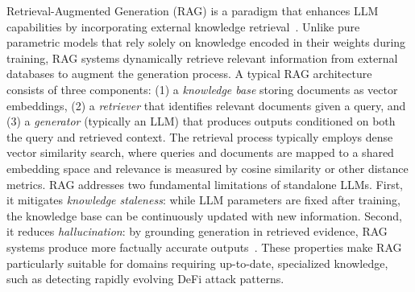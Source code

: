 Retrieval-Augmented Generation (RAG) is a paradigm that enhances LLM capabilities by incorporating external knowledge retrieval~\cite{lewis2021retrievalaugmentedgenerationknowledgeintensivenlp}. Unlike pure parametric models that rely solely on knowledge encoded in their weights during training, RAG systems dynamically retrieve relevant information from external databases to augment the generation process.
A typical RAG architecture consists of three components: (1) a \textit{knowledge base} storing documents as vector embeddings, (2) a \textit{retriever} that identifies relevant documents given a query, and (3) a \textit{generator} (typically an LLM) that produces outputs conditioned on both the query and retrieved context. The retrieval process typically employs dense vector similarity search, where queries and documents are mapped to a shared embedding space and relevance is measured by cosine similarity or other distance metrics.
RAG addresses two fundamental limitations of standalone LLMs. First, it mitigates \textit{knowledge staleness}: while LLM parameters are fixed after training, the knowledge base can be continuously updated with new information. Second, it reduces \textit{hallucination}: by grounding generation in retrieved evidence, RAG systems produce more factually accurate outputs~\cite{llmhallucination2024}. These properties make RAG particularly suitable for domains requiring up-to-date, specialized knowledge, such as detecting rapidly evolving DeFi attack patterns.
